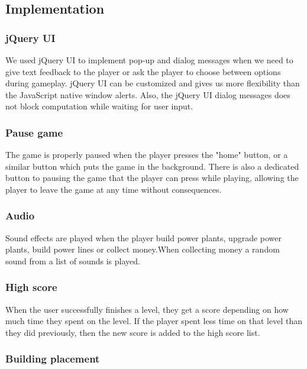 \subsection{Implementation}

	\subsubsection*{jQuery UI}

	We used jQuery UI to implement pop-up and dialog messages when we need to give text feedback to the player or ask the player to choose between options during gameplay. jQuery UI can be customized and gives us more flexibility than the JavaScript native window alerts. Also, the jQuery UI dialog messages does not block computation while waiting for user input\cite{jqueryui}.

	\subsubsection*{Pause game}

	The game is properly paused when the player presses the "home" button, or a
	similar button which puts the game in the background. There is also a
	dedicated button to pausing the game that the player can press while
	playing, allowing the player to leave the game at any time without
	consequences.

	\subsubsection*{Audio}

	Sound effects are played when the player build power plants, upgrade
	power plants, build power lines or collect money.When collecting money a
	random sound from a list of sounds is played.

	\subsubsection*{High score}

	When the user successfully finishes a level, they get a score depending on
	how much time they spent on the level. If the player spent less time on that
	level than they did previously, then the new score is added to the high score
	list.

	\subsubsection*{Building placement}

